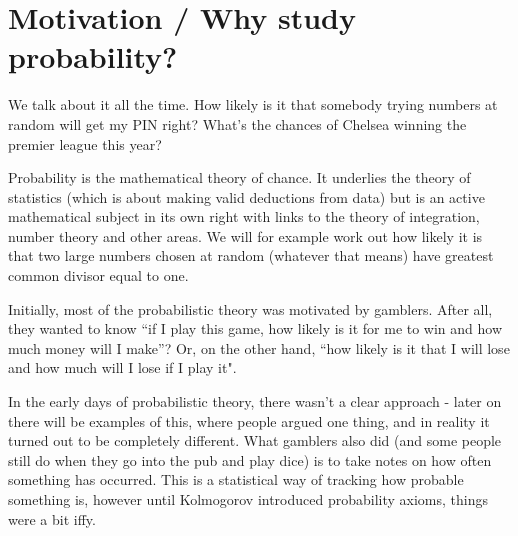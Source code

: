 \section{Motivation / Why study probability?} 

We talk about it all the time. How likely is it that somebody trying numbers at random will get my PIN right? What's the chances of Chelsea winning the premier league this year?  

Probability is the mathematical theory of chance. It underlies the theory of statistics (which is about making valid deductions from data) but is an active mathematical subject in its own right with links to the theory of integration, number theory and other areas. We will for example work out how likely it is that two large numbers chosen at random (whatever that means) have greatest common divisor equal to one. 

Initially, most of the probabilistic theory was motivated by gamblers. After all, they wanted to know ``if I play this game, how likely is it for me to win and how much money will I make''? Or, on the other hand, ``how likely is it that I will lose and how much will I lose if I play it". 

In the early days of probabilistic theory, there wasn't a clear approach - later on there will be examples of this, where people argued one thing, and in reality it turned out to be completely different. What gamblers also did (and some people still do when they go into the pub and play dice) is to take notes on how often something has occurred. This is a statistical way of tracking how probable something is, however until Kolmogorov introduced probability axioms, things were a bit iffy. 

